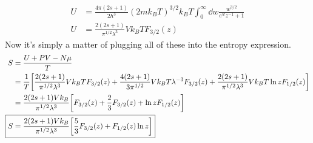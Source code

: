 \documentclass[12pt, letterpaper, twoside]{article}
\begin{document}
{\begin{align}
        U &= \frac{4\pi (2s + 1)}{2 h^3} (2 m k_B T)^{3/2} k_B T \int_0^\infty \dd{w} \frac{w^{3/2}}{e^w z^{-1} + 1} \\
        U &= \frac{2(2s + 1)}{\pi^{1/2} \lambda^3} V k_B T F_{3/2}(z)
    \end{align}
    Now it's simply a matter of plugging all of these into the entropy expression.
    \begin{align}
        S &= \frac{U + PV - N \mu}{T} \\
          &= \frac{1}{T} \qty[ \frac{2(2s + 1)}{\pi^{1/2} \lambda^3} V k_B T F_{3/2}(z) + \frac{4(2s + 1)}{3 \pi^{1/2}} V k_B T \lambda^{-3} F_{3/2}(z) + \frac{2(2s + 1)}{\pi^{1/2} \lambda^3} V k_B T \ln z F_{1/2}(z)] \\
          &= \frac{2(2s + 1) V k_B}{\pi^{1/2} \lambda^3} \qty[ F_{3/2}(z) + \frac{2}{3} F_{3/2}(z) + \ln z F_{1/2}(z)] \\
        \Aboxed{ S &= \frac{2(2s + 1) V k_B}{\pi^{1/2} \lambda^3} \qty[ \frac{5}{3} F_{3/2}(z) + F_{1/2}(z) \ln z] }
    \end{align}
}
\end{document}
